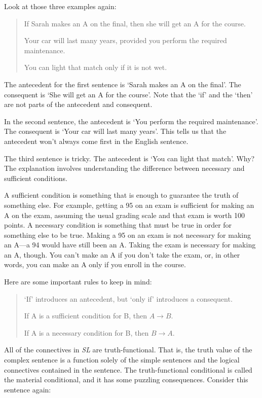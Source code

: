 \documentclass[../logic-text.tex]{subfiles}
\begin{document}
Look at those three examples again:

\begin{quote}


  If Sarah makes an A on the final, then she will get an A for the course.

  Your car will last many years, provided you perform the required maintenance.

  You can light that match only if it is not wet.
\end{quote}

The antecedent for the first sentence is \enquote*{Sarah makes an A on the final}. The consequent is \enquote*{She will get an A for the course}. Note that the \enquote*{if} and the \enquote*{then} are not parts of the antecedent and consequent.

In the second sentence, the antecedent is \enquote*{You perform the required maintenance}. The consequent is \enquote*{Your car will last many years}. This tells us that the antecedent won't always come first in the English sentence.

The third sentence is tricky. The antecedent is \enquote*{You can light that match}. Why? The explanation involves understanding the difference between necessary and sufficient conditions.

A sufficient condition is something that is enough to guarantee the truth of something else. For example, getting a 95 on an exam is sufficient for making an A on the exam, assuming the usual grading scale and that exam is worth 100 points. A necessary condition is something that must be true in order for something else to be true. Making a 95 on an exam is not necessary for making an A---a 94 would have still been an A. Taking the exam is necessary for making an A, though. You can't make an A if you don't take the exam, or, in other words, you can make an A only if you enroll in the course.

Here are some important rules to keep in mind:

\begin{quote}


  `If' introduces an antecedent, but \enquote*{only if} introduces a consequent.

  If A is a sufficient condition for B, then \(A \rightarrow B\).

  If A is a necessary condition for B, then \(B \rightarrow A\).
\end{quote}


All of the connectives in \emph{SL} are truth-functional. That is, the truth value of the complex sentence is a function solely of the simple sentences and the logical connectives contained in the sentence. The truth-functional conditional is called the material conditional, and it has some puzzling consequences. Consider this sentence again:
\end{document}
